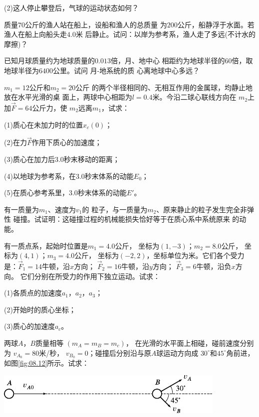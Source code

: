 \begin{exercises}
(2)这人停止攀登后，气球的运动状态如何？

\exercise 质量$ 70 $公斤的渔人站在船上，设船和渔人的总质量
为$ 200 $公斤，船静浮于水面。若渔人在船上向船头走$ 4.0 $米
后静止。试问：以岸为参考系，渔人走了多远(不计水的摩擦)？

\exercise 已知月球质量约为地球质量的$ 0.013 $倍，月、地中心
相距约为地球半径的$ 60 $倍，取地球半径为$ 6400 $公里。试问
月-地系统的质
心离地球中心多远？

\exercise \;$ m _ { 1 } = 12 $公斤和$ m _ { 2 } = 20 $公斤
的两个半径相同的、无相互作用的金属球，均静止地放在水平光滑的桌
面上，两球中心相距为$ l = 0.4 $米。今沿二球心联线方向在
$ m _ { 2 } $上加$ \vec { F } = 64 $公斤力，使
$ m _ { 2 } $远离$ m _ { 1 } $，试求：

(1)质心在未加力时的位置$ x _ { c } \left( 0 \right) $；

(2)在力$ \vec { F } $作用下质心的加速度；

(3)质心在加力后$ 3.0 $秒末移动的距离；

(4)以地球为参考系，在$ 3.0 $秒末体系的动能$ E _ { 0 } $；

(5)在质心参考系里，$ 3.0 $秒末体系的动能$ E ' $。

\exercise 有一质量为$ m _  { 1 } $、速度为$ v _ { 1 } $的
粒子，与一质量为$ m _  { 2 } $、原来静止的粒子发生完全非弹性
碰撞。试证明：这碰撞过程的机械能损失恰好等于在质心系中系统原来
的动能。

\exercise 有一质点系，起始时位置是$ m _ { 1 } = 4.0 $公斤，
坐标为$ \left( 1 , -3 \right) $；$ m _ { 2 } = 8.0 $公斤，
坐标为$ \left( 4 , 1 \right) $；$ m _ { 3 } = 4.0 $公斤，
坐标为$ \left( -2 , 2 \right) $，坐标单位为米。它们各个受力
是：$ \vec { F } _ { 1 } = 14 $牛顿，沿$ x $方向；
$ \vec { F } _ { 2 } = 16 $牛顿，沿$ y $方向；
$ \vec { F } _ { 3 } = 6 $牛顿，沿负$ x $方向。
它们分别在所受力的作用下独立运动。试求：

(1)各质点的加速度$ a _ { 1 } $，$ a _ { 2 } $，$ a _ { 3 } $；

(2)开始时的质心坐标；

(3)质心的加速度$ a _ { c } $。

\exercise 两球$ A $，$ B $质量相等
$ \left( m _ { A } = m _ { B } = m _ { c } \right) $，
在光滑的水平面上相碰，碰前速度分别为
$ v _ { A _ { 0 } } = 80 $米/秒，
$ v _ { B _ { 0 } } = 0 $；碰撞后分别沿与原$ A $球运动方向成
$ 30 ^ \circ $和$ 45 ^ { \circ } $角前进，如图\ref{fig:08.12}所示。试求：
\begin{figurex}
  \vspace{-0.5em}
  \centering
  \includegraphics{figure/fig08.12}
  \vspace{-0.5em}
  \caption{}
  \label{fig:08.12}
\end{figurex}


\end{exercises}
